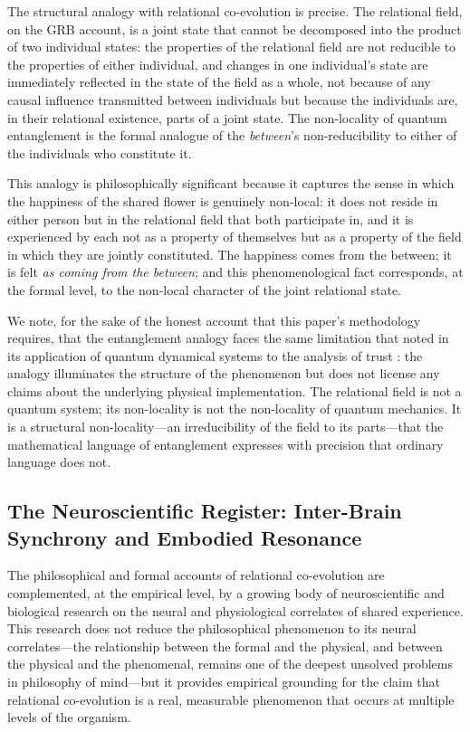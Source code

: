 The structural analogy with relational co-evolution is precise. The relational field, on the GRB account, is a joint state that cannot be decomposed into the product of two individual states: the properties of the relational field are not reducible to the properties of either individual, and changes in one individual's state are immediately reflected in the state of the field as a whole, not because of any causal influence transmitted between individuals but because the individuals are, in their relational existence, parts of a joint state. The non-locality of quantum entanglement is the formal analogue of the \emph{between}'s non-reducibility to either of the individuals who constitute it.

This analogy is philosophically significant because it captures the sense in which the happiness of the shared flower is genuinely non-local: it does not reside in either person but in the relational field that both participate in, and it is experienced by each not as a property of themselves but as a property of the field in which they are jointly constituted. The happiness comes from the between; it is felt \emph{as coming from the between}; and this phenomenological fact corresponds, at the formal level, to the non-local character of the joint relational state.

We note, for the sake of the honest account that this paper's methodology requires, that the entanglement analogy faces the same limitation that  noted in its application of quantum dynamical systems to the analysis of trust \parencite{paperxiii}: the analogy illuminates the structure of the phenomenon but does not license any claims about the underlying physical implementation. The relational field is not a quantum system; its non-locality is not the non-locality of quantum mechanics. It is a structural non-locality---an irreducibility of the field to its parts---that the mathematical language of entanglement expresses with precision that ordinary language does not.

\subsection{The Neuroscientific Register: Inter-Brain Synchrony and Embodied Resonance}
\label{p14:subsec:neuro}

\noindent
The philosophical and formal accounts of relational co-evolution are complemented, at the empirical level, by a growing body of neuroscientific and biological research on the neural and physiological correlates of shared experience. This research does not reduce the philosophical phenomenon to its neural correlates---the relationship between the formal and the physical, and between the physical and the phenomenal, remains one of the deepest unsolved problems in philosophy of mind---but it provides empirical grounding for the claim that relational co-evolution is a real, measurable phenomenon that occurs at multiple levels of the organism.

